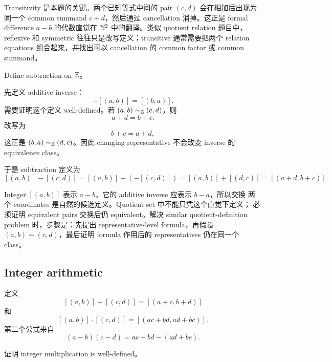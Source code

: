 \begin{explanation}
Transitivity 是本题的关键。两个已知等式中间的 pair \((c,d)\) 会在相加后出现为
同一个 common summand \(c+d\)，然后通过 cancellation 消掉。这正是 formal
difference \(a-b\) 的代数直觉在 \(\mathbb{N}^2\) 中的翻译。类似 quotient relation
题目中，reflexive 和 symmetric 往往只是改写定义；transitive 通常需要把两个
relation equations 组合起来，并找出可以 cancellation 的 common factor 或 common
summand。
\end{explanation}

\begin{exerciseblock}
Define subtraction on \(\mathbb{Z}\)。
\end{exerciseblock}

\begin{solution}
先定义 additive inverse：
\[
  -[(a,b)]=[(b,a)].
\]
需要证明这个定义 well-defined。若 \((a,b)\sim_{\mathbb{Z}}(c,d)\)，则
\[
  a+d=b+c.
\]
改写为
\[
  b+c=a+d,
\]
这正是 \((b,a)\sim_{\mathbb{Z}}(d,c)\)。因此 changing representative 不会改变 inverse
的 equivalence class。

于是 subtraction 定义为
\[
  [(a,b)]-[(c,d)]
  =[(a,b)]+(-[(c,d)])
  =[(a,b)]+[(d,c)]
  =[(a+d,b+c)].
\]
\end{solution}

\begin{explanation}
Integer \([(a,b)]\) 表示 \(a-b\)，它的 additive inverse 应表示 \(b-a\)，所以交换
两个 coordinates 是自然的候选定义。Quotient set 中不能只凭这个直觉下定义；
必须证明 equivalent pairs 交换后仍 equivalent。解决 similar quotient-definition
problem 时，步骤是：先提出 representative-level formula，再假设
\((a,b)\sim(c,d)\)，最后证明 formula 作用后的 representatives 仍在同一个 class。
\end{explanation}

\subsection{Integer arithmetic}

定义
\[
[(a,b)]+[(c,d)]=[(a+c,b+d)]
\]
和
\[
[(a,b)]\cdot[(c,d)]=[(ac+bd,ad+bc)].
\]
第二个公式来自
\[
  (a-b)(c-d)=ac+bd-(ad+bc).
\]

\begin{exerciseblock}
证明 integer multiplication is well-defined。
\end{exerciseblock}

